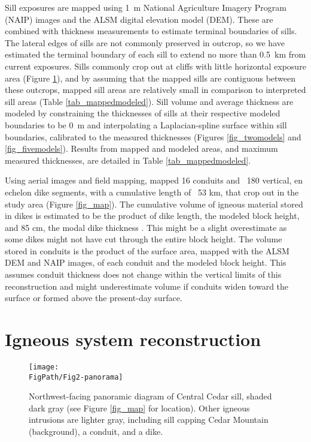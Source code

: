 Sill exposures are mapped using 1~m National Agriculture Imagery Program (NAIP) images and the ALSM digital elevation model (DEM). These are combined with thickness measurements to estimate terminal boundaries of sills. The lateral edges of sills are not commonly preserved in outcrop, so we have estimated the terminal boundary of each sill to extend no more than 0.5~km from current exposures. Sills commonly crop out at cliffs with little horizontal exposure area (Figure \ref{fig_panorama}), and by assuming that the mapped sills are contiguous between these outcrops, mapped sill areas are relatively small in comparison to interpreted sill areas (Table \ref{tab_mappedmodeled}). Sill volume and average thickness are modeled by constraining the thicknesses of sills at their respective modeled boundaries to be 0~m and interpolating a Laplacian-spline surface within sill boundaries, calibrated to the measured thicknesses (Figures \ref{fig_twomodels} and \ref{fig_fivemodels}). Results from mapped and modeled areas, and maximum measured thicknesses, are detailed in Table \ref{tab_mappedmodeled}.

Using aerial images and field mapping, \citet{kiyosugi2012relationship} mapped 16 conduits and ~180 vertical, en echelon dike segments, with a cumulative length of ~53 km, that crop out in the study area (Figure \ref{fig_map}). The cumulative volume of igneous material stored in dikes is estimated to be the product of dike length, the modeled block height, and 85 cm, the modal dike thickness \citep{delaney1997physical}. This might be a slight overestimate as some dikes might not have cut through the entire block height. The volume stored in conduits is the product of the surface area, mapped with the ALSM DEM and NAIP images, of each conduit and the modeled block height. This assumes conduit thickness does not change within the vertical limits of this reconstruction and might underestimate volume if conduits widen toward the surface or formed above the present-day surface.

\section{Igneous system reconstruction}

\begin{figure}
\centering
\texttt{[image: \\FigPath/Fig2-panorama]}
\caption[Northwest-facing panoramic diagram of Central Cedar sill, shaded dark gray (see Figure \ref{fig_map} for location)]{Northwest-facing panoramic diagram of Central Cedar sill, shaded dark gray (see Figure \ref{fig_map} for location). Other igneous intrusions are lighter gray, including sill capping Cedar Mountain (background), a conduit, and a dike.}
\label{fig_panorama}
\end{figure}

